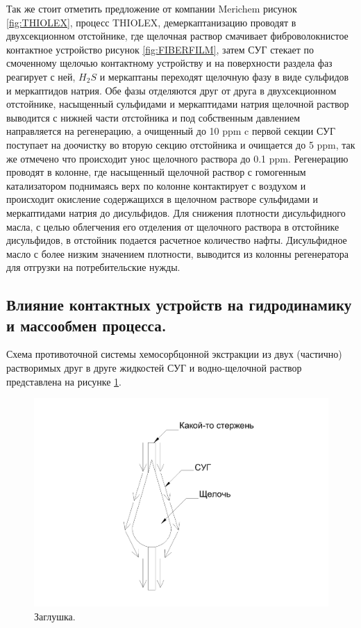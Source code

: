 Так же стоит отметить предложение от компании Merichem рисунок \cref{fig:THIOLEX}, 
процесс THIOLEX, демеркаптанизацию проводят в двухсекционном отстойнике, где щелочная раствор смачивает фиброволокнистое контактное устройство рисунок \cref{fig:FIBERFILM}, затем СУГ стекает по смоченному щелочью контактному устройству и на поверхности раздела фаз реагирует с ней, $H_2S$ и меркаптаны переходят щелочную фазу в виде сульфидов и меркаптидов натрия. Обе фазы отделяются друг от друга в двухсекционном отстойнике, насыщенный сульфидами и меркаптидами натрия щелочной раствор выводится с нижней части отстойника и под собственным давлением направляется на регенерацию, а очищенный до \num{10} ppm c первой секции СУГ поступает на доочистку во вторую секцию отстойника и очищается до \num{5} ppm, так же отмечено что происходит унос щелочного раствора до \num{0,1} ppm. Регенерацию проводят в колонне, где насыщенный щелочной раствор с гомогенным катализатором поднимаясь верх по колонне контактирует с воздухом и происходит окисление содержащихся в щелочном растворе сульфидами и меркаптидами натрия до дисульфидов. Для снижения плотности дисульфидного масла, с целью облегчения его отделения от щелочного раствора в отстойнике дисульфидов, в отстойник подается расчетное количество нафты. Дисульфидное масло с более низким значением плотности, выводится из колонны регенератора для отгрузки на потребительские нужды.

\subsection{Влияние контактных устройств на гидродинамику и массообмен процесса.} \label{sec:ch1/sec3}

Схема противоточной системы хемосорбцонной экстракции из двух (частично) растворимых друг в друге жидкостей СУГ и водно-щелочной раствор представлена на рисунке \cref{fig:cheme}.

\begin{figure}
	\centering
	\includegraphics[width=0.6\linewidth]{images/fibr}
	\caption{Заглушка.}
	\label{fig:cheme}
\end{figure}

